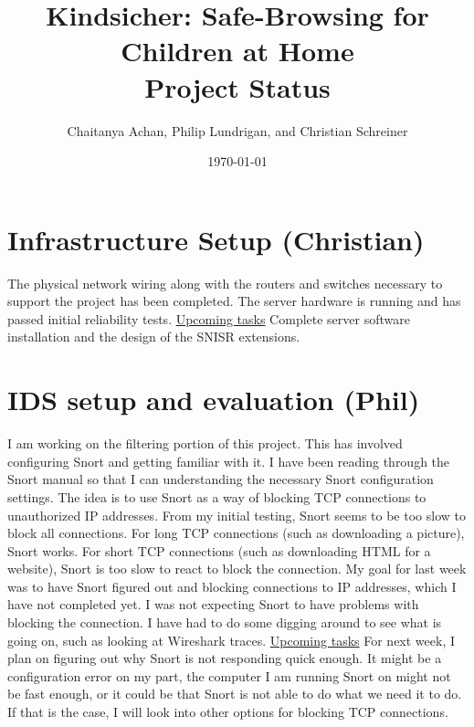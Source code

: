 \documentclass[12pt] {article}
\begin{document}
\title{Kindsicher: Safe-Browsing for Children at Home \\ \vspace{1 mm} {\normalsize Project Status}}
\author{Chaitanya Achan, Philip Lundrigan, and Christian Schreiner}
\date \today
\maketitle
\setcounter{page}{1}

\section*{Infrastructure Setup {\normalsize (Christian)}}
The physical network wiring along with the routers and switches necessary to support the project has been completed. The server hardware is running and has passed initial reliability tests.
\newline
\newline
\underline{Upcoming tasks}
\newline
Complete server software installation and the design of the SNISR extensions.

\section*{IDS setup and evaluation {\normalsize (Phil)}}
I am working on the filtering portion of this project. This has involved configuring Snort and getting familiar with it. I have been reading through the Snort manual so that I can understanding the necessary Snort configuration settings. The idea is to use Snort as a way of blocking TCP connections to unauthorized IP addresses. From my initial testing, Snort seems to be too slow to block all connections. For long TCP connections (such as downloading a picture), Snort works. For short TCP connections (such as downloading HTML for a website), Snort is too slow to react to block the connection.
\newline
\newline
My goal for last week was to have Snort figured out and blocking connections to IP addresses, which I have not completed yet. I was not expecting Snort to have problems with blocking the connection. I have had to do some digging around to see what is going on, such as looking at Wireshark traces.
\newline
\newline
\underline{Upcoming tasks}
\newline
For next week, I plan on figuring out why Snort is not responding quick enough. It might be a configuration error on my part, the computer I am running Snort on might not be fast enough, or it could be that Snort is not able to do what we need it to do. If that is the case, I will look into other options for blocking TCP connections.
\end{document}
